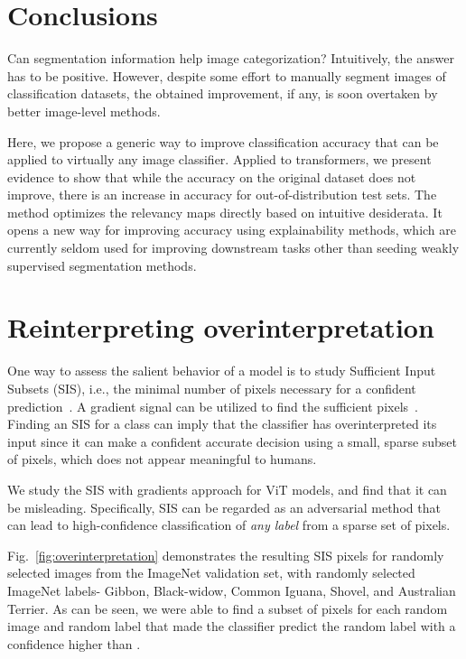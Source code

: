 \documentclass{article}
\begin{document}
\section{Conclusions}
Can segmentation information help image categorization? Intuitively, the answer has to be positive. However, despite some effort to manually segment images of classification datasets, the obtained improvement, if any, is soon overtaken by better image-level methods. 

Here, we propose a generic way to improve classification accuracy that can be applied to virtually any image classifier. Applied to transformers, we present evidence to show that while the accuracy on the original dataset does not improve, there is an increase in accuracy for out-of-distribution test sets.
The method optimizes the relevancy maps directly based on intuitive desiderata. It opens a new way for improving accuracy using explainability methods, which are currently seldom used for improving downstream tasks other than seeding weakly supervised segmentation methods.





\newpage
\appendix

\section{Reinterpreting overinterpretation}
\label{sec:sis}
One way to assess the salient behavior of a model is to study Sufficient Input Subsets (SIS), i.e., the minimal number of pixels necessary for a confident prediction~\cite{carter2019made}. A gradient signal can be utilized to find the sufficient pixels~\cite{overinterpretation}. Finding an SIS for a class can imply that the classifier has overinterpreted its input since it can make a confident accurate decision using a small, sparse subset of pixels, which does not appear meaningful to humans. 

We study the SIS with gradients approach for ViT models, and find that it can be misleading. Specifically, SIS can be regarded as an adversarial method that can lead to high-confidence classification of {\em any label} from a sparse set of pixels.

Fig.~\ref{fig:overinterpretation} demonstrates the resulting SIS pixels for  randomly selected images from the ImageNet validation set, with  randomly selected ImageNet labels- Gibbon, Black-widow, Common Iguana, Shovel, and Australian Terrier. As can be seen, we were able to find a subset of pixels for each random image and random label that made the classifier predict the random label with a confidence higher than . 
\end{document}
